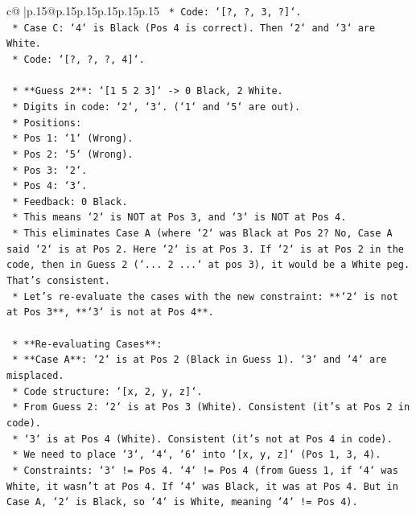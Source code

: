 \documentclass{article}
\begin{document}
{\begin{supertabular}{c@{$\;$}|p{.15\linewidth}@{}p{.15\linewidth}p{.15\linewidth}p{.15\linewidth}p{.15\linewidth}p{.15\linewidth}}
{{{\texttt{            *   Code: `{[}?, ?, 3, ?{]}`.} \\
\texttt{        *   Case C: `4` is Black (Pos 4 is correct). Then `2` and `3` are White.} \\
\texttt{            *   Code: `{[}?, ?, ?, 4{]}`.} \\
\\ 
\texttt{    *   **Guess 2**: `{[}1 5 2 3{]}` {-}> 0 Black, 2 White.} \\
\texttt{        *   Digits in code: `2`, `3`. (`1` and `5` are out).} \\
\texttt{        *   Positions:} \\
\texttt{            *   Pos 1: `1` (Wrong).} \\
\texttt{            *   Pos 2: `5` (Wrong).} \\
\texttt{            *   Pos 3: `2`.} \\
\texttt{            *   Pos 4: `3`.} \\
\texttt{        *   Feedback: 0 Black.} \\
\texttt{        *   This means `2` is NOT at Pos 3, and `3` is NOT at Pos 4.} \\
\texttt{        *   This eliminates Case A (where `2` was Black at Pos 2? No, Case A said `2` is at Pos 2. Here `2` is at Pos 3. If `2` is at Pos 2 in the code, then in Guess 2 (`... 2 ...` at pos 3), it would be a White peg. That's consistent.} \\
\texttt{        *   Let's re{-}evaluate the cases with the new constraint: **`2` is not at Pos 3**, **`3` is not at Pos 4**.} \\
\\ 
\texttt{    *   **Re{-}evaluating Cases**:} \\
\texttt{        *   **Case A**: `2` is at Pos 2 (Black in Guess 1). `3` and `4` are misplaced.} \\
\texttt{            *   Code structure: `{[}x, 2, y, z{]}`.} \\
\texttt{            *   From Guess 2: `2` is at Pos 3 (White). Consistent (it's at Pos 2 in code).} \\
\texttt{            *   `3` is at Pos 4 (White). Consistent (it's not at Pos 4 in code).} \\
\texttt{            *   We need to place `3`, `4`, `6` into `{[}x, y, z{]}` (Pos 1, 3, 4).} \\
\texttt{            *   Constraints: `3` != Pos 4. `4` != Pos 4 (from Guess 1, if `4` was White, it wasn't at Pos 4. If `4` was Black, it was at Pos 4. But in Case A, `2` is Black, so `4` is White, meaning `4` != Pos 4).} \\
}}}
\end{supertabular}}
\end{document}
